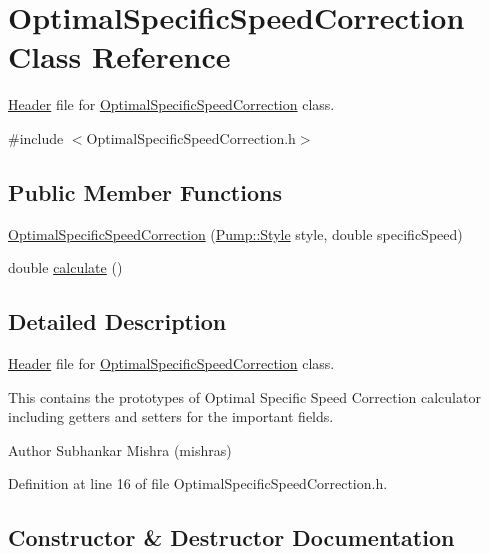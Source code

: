 \hypertarget{class_optimal_specific_speed_correction}{}\section{Optimal\+Specific\+Speed\+Correction Class Reference}
\label{class_optimal_specific_speed_correction}


\hyperlink{class_header}{Header} file for \hyperlink{class_optimal_specific_speed_correction}{Optimal\+Specific\+Speed\+Correction} class.  




{\ttfamily \#include $<$Optimal\+Specific\+Speed\+Correction.\+h$>$}

\subsection*{Public Member Functions}
\begin{DoxyCompactItemize}
\item 
\hyperlink{class_optimal_specific_speed_correction_a59cfd32e730fabce525602cbe0b646c4}{Optimal\+Specific\+Speed\+Correction} (\hyperlink{class_pump_aef354601ce4218258cc898b35a1e90ff}{Pump\+::\+Style} style, double specific\+Speed)
\item 
double \hyperlink{class_optimal_specific_speed_correction_a3337ebde4e64c20f19adbda6204fa0be}{calculate} ()
\end{DoxyCompactItemize}


\subsection{Detailed Description}
\hyperlink{class_header}{Header} file for \hyperlink{class_optimal_specific_speed_correction}{Optimal\+Specific\+Speed\+Correction} class. 

This contains the prototypes of Optimal Specific Speed Correction calculator including getters and setters for the important fields.

\begin{DoxyAuthor}{Author}
Subhankar Mishra (mishras) 
\end{DoxyAuthor}


Definition at line 16 of file Optimal\+Specific\+Speed\+Correction.\+h.



\subsection{Constructor \& Destructor Documentation}
\mbox{\label{class_optimal_specific_speed_correction_a59cfd32e730fabce525602cbe0b646c4}} 
